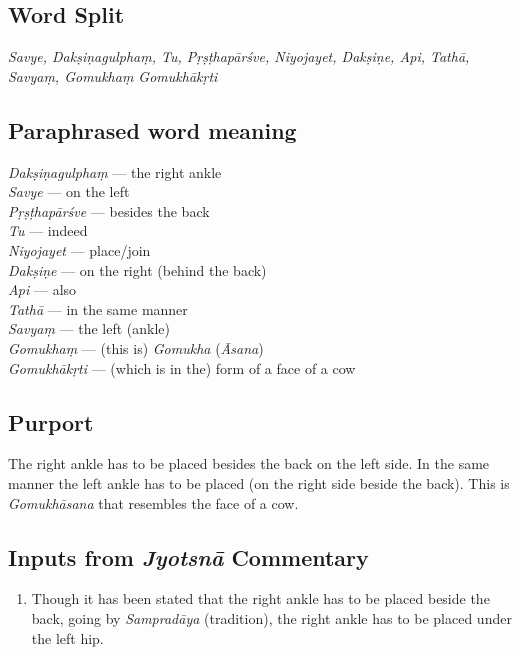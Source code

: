 \subsection*{Word Split}

\textit{Savye, Dakṣiṇagulphaṃ, Tu, Pṛṣṭhapārśve, Niyojayet, Dakṣiṇe, Api, Tathā, Savyaṃ, Gomukhaṃ Gomukhākṛti}

\subsection*{Paraphrased word meaning}

\begin{multicols}{2}
\textit{Dakṣiṇagulphaṃ} --- the right ankle\\ 
\textit{Savye} --- on the left\\ 
\textit{Pṛṣṭhapārśve} --- besides the back\\ 
\textit{Tu} --- indeed\\ 
\textit{Niyojayet} --- place/join\\ 
\textit{Dakṣiṇe} --- on the right (behind the back)\\ 
\textit{Api} --- also\\
\textit{Tathā} --- in the same manner\\
\textit{Savyaṃ} --- the left (ankle)\\
\textit{Gomukhaṃ} --- (this is) \textit{Gomukha} (\textit{Āsana})\\
\textit{Gomukhākṛti} --- (which is in the) form of a face of a cow\\
\end{multicols}

\subsection*{Purport}

The right ankle has to be placed besides the back on the left side. In the same manner the left ankle has to be placed (on the right side beside the back). This is \textit{Gomukhāsana} that resembles the face of a cow.

\subsection*{Inputs from \textit{Jyotsnā} Commentary}

\begin{enumerate}
\item Though it has been stated that the right ankle has to be placed beside the back, going by \textit{Sampradāya} (tradition), the right ankle has to be placed under the left hip.
\end{enumerate}

